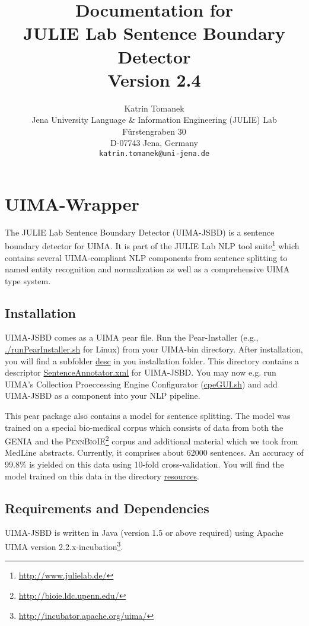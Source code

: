 \documentclass[11pt,a4paper,halfparskip]{scrartcl}
\title{\small{Documentation for}\\\huge JULIE Lab Sentence Boundary Detector\\\vspace{3mm}\small{Version 2.4}}
\author{\normalsize Katrin Tomanek\\
  \normalsize  Jena University Language \& Information Engineering (JULIE) Lab\\
  \normalsize F\"urstengraben 30 \\
  \normalsize D-07743 Jena, Germany\\
  {\normalsize \tt katrin.tomanek@uni-jena.de} }
\date{}
\begin{document}
\maketitle
\tableofcontents

\section{UIMA-Wrapper}



The JULIE Lab Sentence Boundary Detector (UIMA-JSBD) is a sentence
boundary detector for UIMA.  It is part of the JULIE Lab NLP tool
suite\footnote{\url{http://www.julielab.de/}} which contains several
UIMA-compliant NLP components from sentence splitting to named entity
recognition and normalization as well as a comprehensive UIMA type
system.

\subsection{Installation}

UIMA-JSBD comes as a UIMA pear file. Run the Pear-Installer (e.g.,
\url{./runPearInstaller.sh} for Linux) from your UIMA-bin directory.
After installation, you will find a subfolder \url{desc} in you
installation folder. This directory contains a descriptor
\url{SentenceAnnotator.xml} for UIMA-JSBD. You may now e.g. run UIMA's
Collection Proeccessing Engine Configurator (\url{cpeGUI.sh}) and add
UIMA-JSBD as a component into your NLP pipeline.

This pear package also contains a model for sentence splitting. The
model was trained on a special bio-medical corpus which consists of
data from both the GENIA \cite{ohta2002} and the
\textsc{PennBioIE}\footnote{\url{http://bioie.ldc.upenn.edu/}} corpus
and additional material which we took from MedLine abstracts.
Currently, it comprises about 62000 sentences. An accuracy of 99.8\%
is yielded on this data using 10-fold cross-validation.  You will find
the model trained on this data in the directory \url{resources}.


\subsection{Requirements and Dependencies}

UIMA-JSBD is written in Java (version 1.5 or above required) using
Apache UIMA version
2.2.x-incubation\footnote{\url{http://incubator.apache.org/uima/}}.
\end{document}
